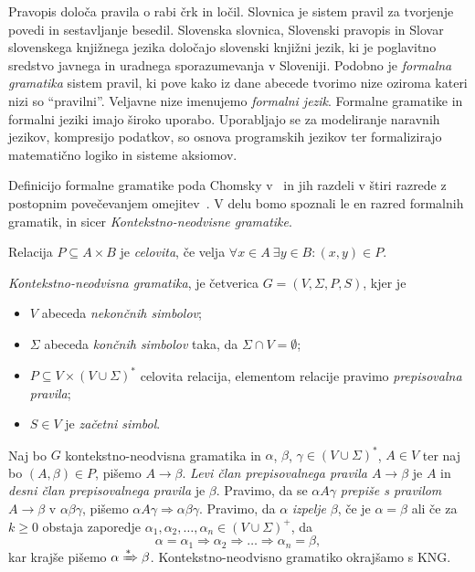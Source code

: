 \documentclass[fin1, tisk]{fmfdelo}
\theoremstyle{definition}
\begin{document}
Pravopis določa pravila o rabi črk in ločil. Slovnica je sistem pravil 
za tvorjenje povedi in sestavljanje besedil. Slovenska slovnica, Slovenski pravopis in Slovar 
slovenskega knjižnega jezika določajo slovenski knjižni jezik, ki je poglavitno sredstvo javnega 
in uradnega sporazumevanja v Sloveniji. Podobno je \emph{formalna gramatika} sistem pravil, ki pove
kako iz dane abecede tvorimo nize oziroma kateri nizi so ``pravilni''. Veljavne nize imenujemo 
\emph{formalni jezik}. Formalne gramatike in formalni jeziki imajo široko uporabo. Uporabljajo se
za modeliranje naravnih jezikov, kompresijo podatkov, so osnova programskih jezikov ter 
formalizirajo matematično logiko in sisteme aksiomov.

Definicijo formalne gramatike poda Chomsky v~\cite{Chomsky1956} in jih razdeli v štiri razrede z 
postopnim povečevanjem omejitev~\cite{Chomsky1959, ChomskySchutzenberger1963}.
V delu bomo spoznali le en razred formalnih gramatik, in sicer \emph{Kontekstno-neodvisne gramatike}.

\begin{definicija}
    Relacija $ P \subseteq A \times B $ je \emph{celovita}, če velja 
    $\forall x \in A \ \exists y \in B \colon (x,y) \in P$.
\end{definicija}

\begin{definicija}
    \emph{Kontekstno-neodvisna gramatika}, je četverica $G = (V, \Sigma, P, S)$,
    kjer je
    \begin{itemize}
        \item $V$ abeceda \emph{nekončnih simbolov};
        \item $\Sigma$ abeceda \emph{končnih simbolov} taka, da $\Sigma \cap V = \emptyset$;
        \item $P \subseteq V \times ( V \cup \Sigma )^*$ celovita relacija, elementom 
        relacije pravimo \emph{prepisovalna pravila};
        \item $S \in V$ je \emph{začetni simbol}.
    \end{itemize}
\end{definicija}

\begin{definicija}
    Naj bo $G$ kontekstno-neodvisna gramatika in $\alpha$, $\beta$, $\gamma \in (V \cup \Sigma)^*$,
    $A \in V$ ter naj bo $(A, \beta) \in P$, pišemo $A \rightarrow \beta$. 
    \emph{Levi član prepisovalnega pravila $A \rightarrow \beta$} je $A$ in 
    \emph{desni član prepisovalnega pravila} je $\beta$. Pravimo, da se 
    $\alpha A \gamma$ \emph{prepiše s pravilom} $A \rightarrow \beta$ v $\alpha\beta\gamma$,
    pišemo $\alpha A \gamma \Rightarrow \alpha\beta\gamma$. Pravimo, da $\alpha $ \emph{izpelje} 
    $\beta$, če je $\alpha = \beta$ ali če za $k \geq 0$ obstaja zaporedje 
    $\alpha_1, \alpha_2, \ldots, \alpha_n \in (V \cup \Sigma)^+$, da 
    \[
        \alpha = \alpha_1 \Rightarrow \alpha_2 \Rightarrow \ldots \Rightarrow \alpha_n
        = \beta,
    \]
    kar krajše pišemo $\alpha \xRightarrow{*} \beta$. Kontekstno-neodvisno gramatiko okrajšamo s KNG.
\end{definicija}
\end{document}
